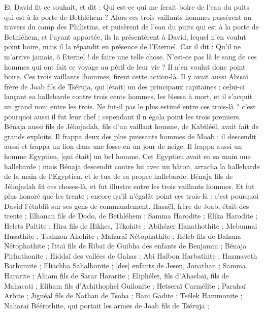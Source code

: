 \begin{multicols}{2}
Et David fit ce souhait, et dit : Qui est-ce qui me ferait boire de l'eau du puits qui est à la porte de Bethléhem ?
Alors ces trois vaillants hommes passèrent au travers du camp des Philistins, et puisèrent de l'eau du puits qui est à la porte de Bethléhem, et l'ayant apportée, ils la présentèrent à David, lequel n'en voulut point boire, mais il la répandit en présence de l'Eternel.
Car il dit : Qu'il ne m'arrive jamais, ô Eternel ! de faire une telle chose. N'est-ce pas là le sang de ces hommes qui ont fait ce voyage au péril de leur vie ? Il n'en voulut donc point boire. Ces trois vaillants [hommes] firent cette action-là.
Il y avait aussi Abisaï frère de Joab fils de Tséruja, qui [était] un des principaux capitaines ; celui-ci lançant sa hallebarde contre trois cents hommes, les blessa à mort, et il s'acquit un grand nom entre les trois.
Ne fut-il pas le plus estimé entre ces trois-là ? c'est pourquoi aussi il fut leur chef ; cependant il n égala point les trois premiers.
Bénaja aussi fils de Jéhojadah, fils d'un vaillant homme, de Kabtléël, avait fait de grands exploits. Il frappa deux des plus puissants hommes de Moab ; il descendit aussi et frappa un lion dans une fosse en un jour de neige.
Il frappa aussi un homme Egyptien, [qui était] un bel homme. Cet Egyptien avait en sa main une hallebarde ; mais Bénaja descendit contre lui avec un bâton, arracha la hallebarde de la main de l'Egyptien, et le tua de sa propre hallebarde.
Bénaja fils de Jéhojadah fit ces choses-là, et fut illustre entre les trois vaillants hommes.
Et fut plus honoré que les trente ; encore qu'il n'égalât point ces trois-là : c'est pourquoi David l'établit sur ses gens de commandement.
Hasaël, frère de Joab, était des trente ; Elhanan fils de Dodo, de Bethléhem ;
Samma Harodite ; Elika Harodite ;
Helets Paltite ; Hira fils de Hikkes, Tékohite ;
Abihézer Hanathothite ; Mebunnai Husathite ;
Tsalmon Ahohite ; Maharaï Nétophathite ;
Héleb fils de Bahana Nétophathite ; Ittaï fils de Ribaï de Guibha des enfants de Benjamin ;
Bénaja Pirhathonite ; Hiddaï des vallées de Gahas ;
Abi Halbon Harbathite ; Hazmaveth Barhumite ;
Eliachba Sahalbonite ; [des] enfants de Jesen, Jonathan ;
Samma Hararite ; Ahiam fils de Sarar Hararite ;
Eliphélet, fils d'Ahasbaï, fils de Mahacati ; Eliham fils d'Achithophel Guilonite ;
Hetseraï Carmélite ; Parahaï Arbite ;
Jiguéal fils de Nathan de Tsoba ; Bani Gadite ;
Tsélek Hammonite ; Naharaï Béérothite, qui portait les armes de Joab fils de Tséruja ;

\end{multicols}
